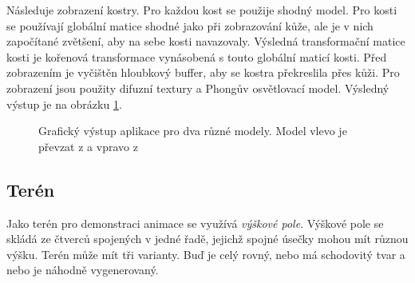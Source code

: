 Následuje zobrazení kostry. Pro každou kost se použije shodný model. Pro kosti se používají globální matice shodné jako při zobrazování kůže, ale je v nich započítané zvětšení, aby na sebe kosti navazovaly.  Výsledná transformační matice kosti je kořenová transformace vynásobená s touto globální maticí kosti. Před zobrazením je vyčištěn hloubkový buffer, aby se kostra překreslila přes kůži. Pro zobrazení jsou použity difuzní textury a Phongův osvětlovací model. Výsledný výstup je na obrázku \ref{graphical_output}.

\begin{figure}[h]
\begin{center}
\qquad
{}
\caption{Grafický výstup aplikace pro dva různé modely. Model vlevo je převzat z \cite{male_mesh} a vpravo z \cite{venom}} \label{graphical_output}
\end{center}
\end{figure}

\subsection{Terén}
Jako terén pro demonstraci animace se využívá \textit{výškové pole}. Výškové pole se skládá ze čtverců spojených v jedné řadě, jejichž spojné úsečky mohou mít různou výšku. Terén může mít tři varianty. Buď je celý rovný, nebo má schodovitý tvar a nebo je náhodně vygenerovaný. 

